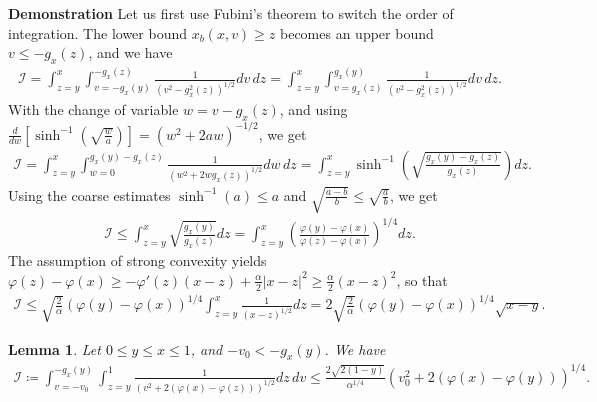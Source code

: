 \documentclass{article}
\newtheorem{lem}{Lemma}[section]
\numberwithin{equation}{section}
\newcommand{\myproof}[1]{
	\noindent \textbf{Demonstration}
	{\small	#1 \hfill \qedsymbol}
}
\begin{document}
\myproof{
	Let us first use Fubini's theorem to switch the order of integration. The lower bound $x_b(x,v) \geqslant z$ becomes an upper bound $v \leqslant -g_x(z)$, and we have
	\begin{align*}
		\mathcal{I} 
		= \int_{z=y}^{x} \int_{v = -g_x(y)}^{-g_x(z)} \frac{1}{\left(v^2-g_x^2(z)\right)^{1/2}} dv\,dz 
		= \int_{z=y}^{x} \int_{v = g_x(z)}^{g_x(y)} \frac{1}{\left(v^2-g_x^2(z)\right)^{1/2}} dv\,dz.
	\end{align*} 
	With the change of variable $w = v - g_x(z)$, and using $\frac{d}{dw} \left[\sinh^{-1}\left(\sqrt{\frac{w}{a}}\right)\right] = \left(w^2 + 2aw\right)^{-1/2}$, we get
	\begin{align*}
		\mathcal{I} 
		= \int_{z=y}^{x} \int_{w = 0}^{g_x(y)-g_x(z)} \frac{1}{\left(w^2 + 2 w g_x(z)\right)^{1/2}} dw\,dz
		= \int_{z=y}^{x} \sinh^{-1}\left(\sqrt{\frac{g_x(y) -g_x(z)}{g_x(z)}}\right) dz.
	\end{align*}
	Using the coarse estimates $\sinh^{-1}(a) \leqslant a$ and $\sqrt{\frac{a-b}{b}} \leqslant \sqrt{\frac{a}{b}}$, we get
	\begin{align*}
		\mathcal{I} \leqslant \int_{z=y}^{x} \sqrt{\frac{g_x(y)}{g_x(z)}} dz = \int_{z=y}^{x} \left(\frac{\varphi(y) - \varphi(x)}{\varphi(z) - \varphi(x)}\right)^{1/4} dz.
	\end{align*}
	The assumption of strong convexity yields $\varphi(z) - \varphi(x) \geqslant - \varphi'(z) (x - z) + \frac{\alpha}{2} |x - z|^2 \geqslant \frac{\alpha}{2} (x - z)^2$, so that 
	\begin{align*}
		\mathcal{I} 
		\leqslant \sqrt{\frac{2}{\alpha}}\left(\varphi(y) - \varphi(x)\right)^{1/4} \int_{z=y}^{x} \frac{1}{\left(x - z\right)^{1/2}} dz 
		= 2 \sqrt{\frac{2}{\alpha}}\left(\varphi(y) - \varphi(x)\right)^{1/4} \sqrt{x-y}.
	\end{align*}
}

\begin{lem}\label{lem:upperbound_ni_beginchar}
	Let $0 \leqslant y \leqslant x \leqslant 1$, and $-v_0 < -g_x(y)$. We have
	\begin{align*}
		\mathcal{I} \coloneqq \int_{v=-v_0}^{-g_x(y)} \int_{z=y}^{1} \frac{1}{\left(v^2 + 2 \left(\varphi(x) - \varphi(z)\right)\right)^{1/2}} dz \, dv \leqslant \frac{2\sqrt{2(1-y)}}{\alpha^{1/4}} \left(v_0^2 + 2 \left(\varphi(x) - \varphi(y)\right)\right)^{1/4}.
	\end{align*}
\end{lem}
\end{document}
